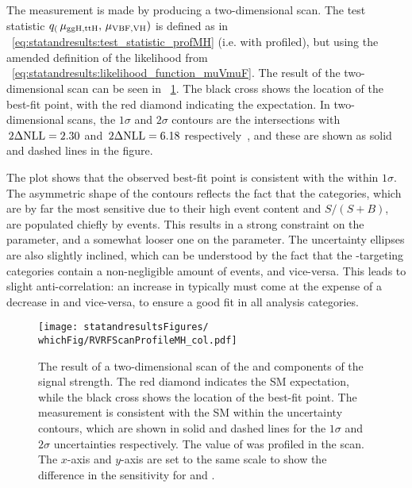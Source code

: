 The measurement is made by producing a two-dimensional \DNLL scan. The test statistic $q_(\,\mu_{\text{ggH},\text{ttH}},\,\mu_{\text{VBF},\text{VH}})$ is defined as in \Eq~\ref{eq:statandresults:test_statistic_profMH} (i.e. with \mH profiled), but using the amended definition of the likelihood from \Eq~\ref{eq:statandresults:likelihood_function_muVmuF}. 
The result of the two-dimensional scan can be seen in \Fig~\ref{fig:statandresults:mu_per_rvrf}. 
The black cross shows the location of the best-fit point, with the red diamond indicating the \SM expectation. In two-dimensional \DNLL scans, the $1\sigma$ and $2\sigma$ contours are the intersections with $\,2\Delta\text{NLL}=2.30$ and $\,2\Delta\text{NLL}=6.18$ respectively~\cite{Cowan}, and these are shown as solid and dashed lines in the figure. 

The plot shows that the observed best-fit point is consistent with the \SM within $1\sigma$. The asymmetric shape of the contours reflects the fact that the \Untagged categories, which are by far the most sensitive due to their high event content and $S/(S+B)$, are populated chiefly by \ggH events. This results in a strong constraint on the \muF parameter, and a somewhat looser one on the \muV parameter. The uncertainty ellipses are also slightly inclined, which can be understood by the fact that the \VBF-targeting categories contain a non-negligible amount of \ggH events, and vice-versa. This leads to slight anti-correlation: an increase in \muF typically must come at the expense of a decrease in \muV and vice-versa, to ensure a good fit in all analysis categories.


\begin{figure}[ht!]
\centering
\texttt{[image: statandresultsFigures/\\whichFig/RVRFScanProfileMH\_col.pdf]} 
\caption{The result of a two-dimensional \DNLL scan of the \muF and \muV components of the signal strength. The red diamond indicates the SM expectation, while the black cross shows the location of the best-fit point. The measurement is consistent with the SM within the uncertainty contours, which are shown in solid and dashed lines for the $1\sigma$ and $2\sigma$ uncertainties respectively. The value of \mH was profiled in the scan. The $x$-axis and $y$-axis are set to the same scale to show the difference in the sensitivity for \muF and \muV. }

\label{fig:statandresults:mu_per_rvrf}
\end{figure}

